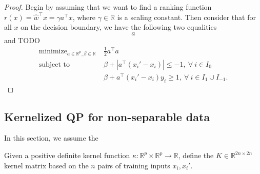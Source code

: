 \documentclass{article}
\newcommand{\RR}{\mathbb R}
\DeclareMathOperator*{\minimize}{minimize}
\begin{document}
\begin{proof}
  Begin by assuming that we want to find a ranking function $r(x)=\hat
  w^\intercal x = \gamma a^\intercal x$, where $\gamma\in\RR$ is a
  scaling constant.  Then consider that for all $x$ on the decision
  boundary, we have the following two equalities
  \begin{equation}
    \label{eq:dec-boundary-rank}
    a
  \end{equation}
and TODO
\begin{equation}
  \label{eq:max-margin-qp}
  \begin{aligned}
    \minimize_{a\in\RR^p, \beta\in\RR}\ & \frac 1 2 a^\intercal a  \\
    \text{subject to}\ & \beta + |a^\intercal (x_i'-x_i)| \leq -1,\
    \forall\  i\in I_0\\
    & \beta + a^\intercal(x_i'-x_i)y_i \geq 1,\ \forall\ i\in I_1\cup I_{-1}.
  \end{aligned}
\end{equation}
\end{proof}


\subsection{Kernelized QP for non-separable data}
\label{sec:svm-compare}

In this section, we assume the 

Given a positive definite kernel function $\kappa:\RR^p\times
\RR^p\rightarrow\RR$, define the $K\in\RR^{2n\times 2n}$ kernel matrix
based on the $n$ pairs of training inputs $x_i,x_i'$.

\end{document}
